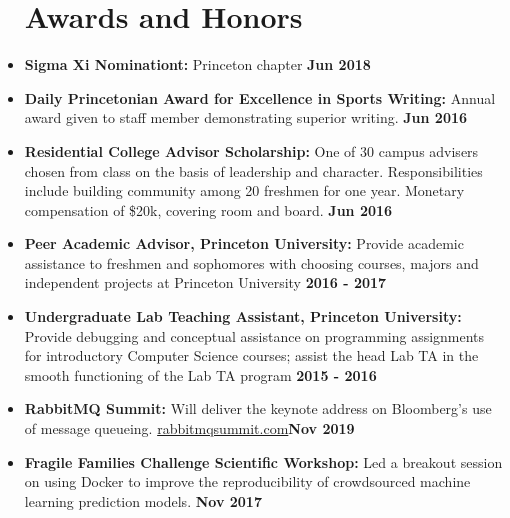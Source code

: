 \documentclass[margin]{res}
\begin{document}
\begin{resume}
\begin{itemize}
\section{Awards  and Honors}
\item
{\bf {Sigma Xi Nominationt:}} Princeton chapter {\bf \hfill Jun 2018}

\item
{\bf {Daily Princetonian Award for Excellence in Sports Writing:}} Annual award given to staff member demonstrating superior writing. {\bf \hfill Jun 2016}

\item
{\bf {Residential College Advisor Scholarship:}} One of 30 campus advisers chosen from class on the basis of leadership and character. Responsibilities include building community among 20 freshmen for one year. Monetary compensation of \$20k, covering room and board. {\bf \hfill Jun 2016}

\end{itemize}

\begin{itemize}
\section {Co-curricular Activities}
\item
{\bf {Peer Academic Advisor, Princeton University:}} Provide academic assistance to freshmen and sophomores with choosing courses, majors and independent projects at Princeton University {\bf \hfill 2016 - 2017}
\item
{\bf {Undergraduate Lab Teaching Assistant, Princeton University:}} Provide debugging and conceptual assistance on programming assignments for introductory Computer Science courses; assist the head Lab TA in the smooth functioning of the Lab TA program {\bf \hfill 2015 - 2016}
\end{itemize}

\begin{itemize}
\section {Talks}
\item
{\bf {RabbitMQ Summit}:} Will deliver the keynote address on Bloomberg's use of message queueing. \url{rabbitmqsummit.com}{\bf \hfill Nov 2019}

\item
{\bf {Fragile Families Challenge Scientific Workshop:}} Led a breakout session on using Docker to improve the reproducibility of crowdsourced machine learning prediction models. {\bf \hfill Nov 2017}\\
\end{itemize}



\end{resume}
\end{document}

